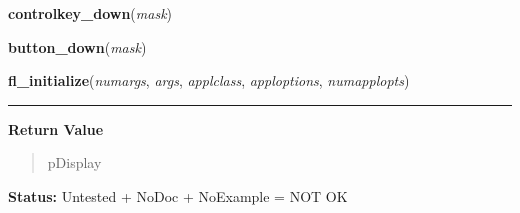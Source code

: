     \vspace{0.5ex}

\hspace{.8\funcindent}\begin{boxedminipage}{\funcwidth}

    \raggedright \textbf{controlkey\_down}(\textit{mask})

\setlength{\parskip}{2ex}
\setlength{\parskip}{1ex}
    \end{boxedminipage}

    \label{xformslib:library:button_down}

    \vspace{0.5ex}

\hspace{.8\funcindent}\begin{boxedminipage}{\funcwidth}

    \raggedright \textbf{button\_down}(\textit{mask})

\setlength{\parskip}{2ex}
\setlength{\parskip}{1ex}
    \end{boxedminipage}

    \label{xformslib:library:fl_initialize}

    \vspace{0.5ex}

\hspace{.8\funcindent}\begin{boxedminipage}{\funcwidth}

    \raggedright \textbf{fl\_initialize}(\textit{numargs}, \textit{args}, \textit{applclass}, \textit{apploptions}, \textit{numapplopts})

    \vspace{-1.5ex}

    \rule{\textwidth}{0.5\fboxrule}
\setlength{\parskip}{2ex}
\setlength{\parskip}{1ex}
      \textbf{Return Value}
    \vspace{-1ex}

      \begin{quote}
      pDisplay

      \end{quote}

\textbf{Status:} Untested + NoDoc + NoExample = NOT OK



    \end{boxedminipage}

